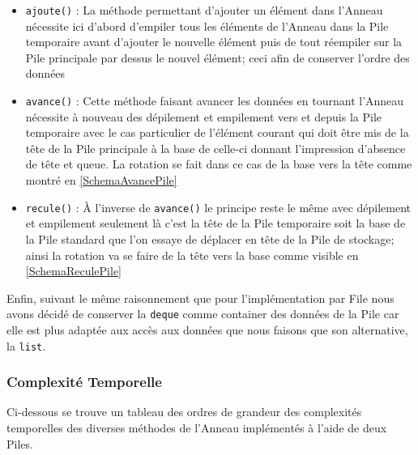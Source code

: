 \documentclass{article}
\newcommand{\info}{\texttt}
\begin{document}
        \begin{itemize}
            \item \info{ajoute()} : La méthode permettant d'ajouter un élément dans l'Anneau nécessite ici d'abord d'empiler tous les éléments de l'Anneau dans la Pile temporaire avant d'ajouter le nouvelle élément puis de tout réempiler sur la Pile principale par dessus le nouvel élément; ceci afin de conserver l'ordre des données
            \item \info{avance()} : Cette méthode faisant avancer les données en tournant l'Anneau nécessite à nouveau des dépilement et empilement vers et depuis la Pile temporaire avec le cas particulier de l'élément courant qui doit être mis de la tête de la Pile principale à la base de celle-ci donnant l'impression d'absence de tête et queue. La rotation se fait dans ce cas de la base vers la tête comme montré en \ref{SchemaAvancePile}
            \item \info{recule()} : \`A l'inverse de \info{avance()} le principe reste le même avec dépilement et empilement seulement là c'est la tête de la Pile temporaire soit la base de la Pile standard que l'on essaye de déplacer en tête de la Pile de stockage; ainsi la rotation va se faire de la tête vers la base comme visible en \ref{SchemaReculePile}
        \end{itemize}
        Enfin, suivant le même raisonnement que pour l'implémentation par File nous avons décidé de conserver la \info{deque} comme container des données de la Pile car elle est plus adaptée aux accès aux données que nous faisons que son alternative, la \info{list}.
        
        \subsubsection{Complexité Temporelle}
        
        Ci-dessous se trouve un tableau des ordres de grandeur des complexités temporelles des diverses méthodes de l'Anneau implémentés à l'aide de deux Piles.
        
\end{document}
